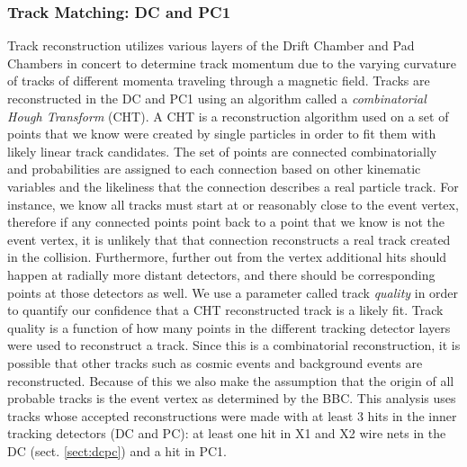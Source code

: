 \subsubsection{Track Matching: DC and PC1}
Track reconstruction utilizes various layers of the Drift Chamber and Pad Chambers in concert to determine track momentum due to the varying curvature of tracks of different momenta traveling through a magnetic field. Tracks are reconstructed in the DC and PC1 using an algorithm called a \textit{combinatorial Hough Transform} (CHT)\citep{Mitchell:2002wu}. A CHT is a reconstruction algorithm used on a set of points that we know were created by single particles in order to fit them with likely linear track candidates\citep{OHLSSON199277}. The set of points are connected combinatorially and probabilities are assigned to each connection based on other kinematic variables and the likeliness that the connection describes a real particle track. For instance, we know all tracks must start at or reasonably close to the event vertex, therefore if any connected points point back to a point that we know is not the event vertex, it is unlikely that that connection reconstructs a real track created in the collision. Furthermore, further out from the vertex additional hits should happen at radially more distant detectors, and there should be corresponding points at those detectors as well.  We use a parameter called track \textit{quality} in order to quantify our confidence that a CHT reconstructed track is a likely fit. Track quality is a function of how many points in the different tracking detector layers were used to reconstruct a track. Since this is a combinatorial reconstruction, it is possible that other tracks such as cosmic events and background events are reconstructed.  Because of this we also make the assumption that the origin of all probable tracks is the event vertex as determined by the BBC. This analysis uses tracks whose accepted reconstructions were made with at least 3 hits in the inner tracking detectors (DC and PC): at least one hit in X1 and X2 wire nets in the DC (sect. \ref{sect:dcpc}) and a hit in PC1.

